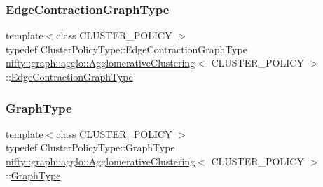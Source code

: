 \mbox{\label{classnifty_1_1graph_1_1agglo_1_1AgglomerativeClustering_ab50801119fbdb9ed78884a64f872e1d8}} 
\subsubsection{\texorpdfstring{Edge\+Contraction\+Graph\+Type}{EdgeContractionGraphType}}
{\footnotesize\ttfamily template$<$class C\+L\+U\+S\+T\+E\+R\+\_\+\+P\+O\+L\+I\+CY $>$ \\
typedef Cluster\+Policy\+Type\+::\+Edge\+Contraction\+Graph\+Type \hyperlink{classnifty_1_1graph_1_1agglo_1_1AgglomerativeClustering}{nifty\+::graph\+::agglo\+::\+Agglomerative\+Clustering}$<$ C\+L\+U\+S\+T\+E\+R\+\_\+\+P\+O\+L\+I\+CY $>$\+::\hyperlink{classnifty_1_1graph_1_1agglo_1_1AgglomerativeClustering_ab50801119fbdb9ed78884a64f872e1d8}{Edge\+Contraction\+Graph\+Type}}

\mbox{\label{classnifty_1_1graph_1_1agglo_1_1AgglomerativeClustering_a0c735105592b55c036be76e3d7fc735f}} 
\subsubsection{\texorpdfstring{Graph\+Type}{GraphType}}
{\footnotesize\ttfamily template$<$class C\+L\+U\+S\+T\+E\+R\+\_\+\+P\+O\+L\+I\+CY $>$ \\
typedef Cluster\+Policy\+Type\+::\+Graph\+Type \hyperlink{classnifty_1_1graph_1_1agglo_1_1AgglomerativeClustering}{nifty\+::graph\+::agglo\+::\+Agglomerative\+Clustering}$<$ C\+L\+U\+S\+T\+E\+R\+\_\+\+P\+O\+L\+I\+CY $>$\+::\hyperlink{classnifty_1_1graph_1_1agglo_1_1AgglomerativeClustering_a0c735105592b55c036be76e3d7fc735f}{Graph\+Type}}

